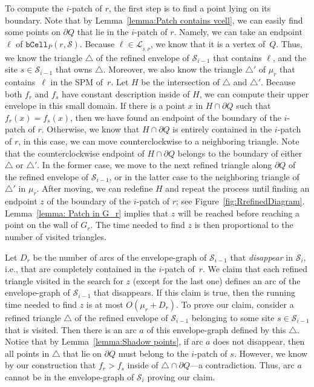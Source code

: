 \documentclass[a4paper,UKenglish]{socg-lipics-v2018}
\newcommand{\icell}[1][i]{${#1}$-patch\xspace}
\newcommand{\s}{\mathcal S}
\newcommand{\bcell}[2][P]{\ensuremath{\mathtt{bCell}_{\scriptscriptstyle #1}(#2)}}
\newcommand{\LL}[1][\s, P]{\ensuremath{\mathcal L_{_{#1}}}}
\begin{document}
To compute the \icell of $r$, the first step is to find a point lying on its boundary.
Note that by Lemma~\ref{lemma:Patch contains vcell}, we can easily find some points on $\partial Q$ that lie in the \icell of $r$.
Namely, we can take an endpoint $\ell$ of $\bcell{r, \s}$. 
Because $\ell\in \LL$, we know that it is a vertex of~$Q$.
Thus, we know the triangle $\triangle$ of the refined envelope of $\s_{i-1}$ that contains $\ell$, and the site $s\in \s_{i-1}$ that owns $\triangle$.
Moreover, we also know the triangle $\triangle'$ of $\mu_r$ that contains~$\ell$ in the SPM of~$r$.
Let $H$ be the intersection of $\triangle$ and $\triangle'$.
Because both $f_r$ and $f_s$ have constant description inside of $H$, we can compute their upper envelope in this small domain.
If there is a point $x$ in $H\cap \partial Q$ such that $f_r(x) = f_s(x)$, then we have found an endpoint of the boundary of the \icell of $r$.
Otherwise, we know that $H\cap \partial Q$ is entirely contained in the \icell of $r$, in this case, we can move counterclockwise to a neighboring triangle.
Note that the counterclockwise endpoint of $H\cap \partial Q$ belongs to the boundary of either $\triangle$ or $\triangle'$. 
In the former case, we move to the next refined triangle along $\partial Q$ of the refined envelope of $\s_{i-1}$, 
or in the latter case to the neighboring triangle of $\triangle'$ in $\mu_r$.
After moving, we can redefine $H$ and repeat the process until finding an endpoint $z$ of the boundary of the \icell of $r$; see Figure~\ref{fig:RrefinedDiagram}. 
Lemma~\ref{lemma: Patch in G_r} implies that $z$ will be reached before reaching a point on the wall of $G_r$.
The time needed to find $z$ is then proportional to the number of visited triangles. 

Let $D_r$ be the number of arcs of the envelope-graph of $\s_{i-1}$ that \emph{disappear} in $\s_i$, i.e., that are completely contained in the \icell of~$r$.
We claim that each refined triangle visited in the search for $z$ (except for the last one) defines an arc of  the  envelope-graph of $\s_{i-1}$ that disappears. 
If this claim is true, then the running time needed to find $z$ is at most $O(\mu_r + D_r)$.
To prove our claim, consider a refined triangle $\triangle$ of the refined envelope of $\s_{i-1}$ belonging to some site $s\in \s_{i-1}$ that is visited. 
Then there is an arc $a$ of this envelope-graph defined by this $\triangle$. 
Notice that by Lemma~\ref{lemma:Shadow points}, if arc $a$ does not disappear, then all points in $\triangle$ that lie on $\partial Q$ must belong to the \icell of $s$. 
However, we know by our construction that $f_r > f_s$ inside of $\triangle\cap \partial Q$---a contradiction. 
Thus, arc $a$ cannot be in the envelope-graph of $\s_i$ proving our claim. 
\end{document}
